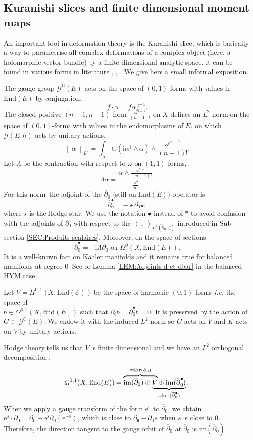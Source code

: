 \documentclass{article}
\theoremstyle{remark}
\theoremstyle{definition}
\newcommand{\C}{\mathbb{C}}
\newcommand{\im}{\mathrm{im}}
\newcommand{\End}{\mathrm{End}}
\newcommand{\tr}{\mathrm{tr}}
\renewcommand{\i}{\boldsymbol{\mathrm{i}}}
\newcommand{\e}{\boldsymbol{\mathrm{e}}}
\newcommand{\scal}[2]{\left< #1,#2 \right>}
\newcommand{\norme}[1]{\left\| #1 \right\|}
\newcommand{\E}{\mathcal{E}}
\newcommand{\G}{\mathcal{G}}
\newcommand{\dbar}{\overline{\partial}}
\begin{document}
\subsection{Kuranishi slices and finite dimensional moment maps}

An important tool in deformation theory is the Kuranishi slice, which is basically a way to parametrise all complex deformations of a complex object (here, a holomorphic vector bundle) by a finite dimensional analytic space. It can be found in various forms in literature \cite{Kuranishi}, \cite[Section 7.3]{Kobayashi}, \cite[Theorem 1]{Buchdahl_Schumacher}. We give here a small informal exposition.

The gauge group $\G^\C(E)$ acts on the space of $(0,1)$-forms with values in $\End(E)$ by conjugation,
$$
f \cdot \alpha = f\alpha f^{-1}.
$$
The closed positive $(n - 1,n - 1)$-form $\frac{\omega^{n - 1}}{(n - 1)!}$ on $X$ defines an $L^2$ norm on the space of $(0,1)$-forms with values in the endomorphisms of $E$, on which $\G(E,h)$ acts by unitary actions,
$$
\norme{\alpha}_{L^2} = \int_X \tr(\i\alpha^\dagger \wedge \alpha) \wedge \frac{\omega^{n - 1}}{(n - 1)!}.
$$
Let $\Lambda$ be the contraction with respect to $\omega$ on $(1,1)$-forms,
$$
\Lambda\alpha = \frac{\alpha \wedge \frac{\omega^{n - 1}}{(n - 1)!}}{\frac{\omega^n}{n!}}.
$$
For this norm, the adjoint of the $\dbar_0$ (still on $\End(E)$) operator is
$$
\dbar_0^\bullet = -\star\partial_0\star,
$$
where $\star$ is the Hodge star. We use the notation $\bullet$ instead of $*$ to avoid confusion with the adjoints of $\dbar_0$ with respect to the $\scal{\cdot}{\cdot}_{L^2(\dbar_0,\zeta)}$ introduced in Sub-section \ref{SEC:Produits scalaires}. Moreover, on the space of sections,
$$
\dbar_0^\bullet = -\i\Lambda\partial_0 \textrm{ on } \Omega^0(X,\End(E)).
$$
It is a well-known fact on Kähler manifolds and it remains true for balanced manifolds at degree $0$. See \cite[Lemma 2.1]{Delloque_2024} or Lemma \ref{LEM:Adjoints d et dbar} in the balanced HYM case.

Let $V = H^{0,1}(X,\End(\E))$ be the space of harmonic $(0,1)$-forms \textit{i.e.} the space of\\
$b \in \Omega^{0,1}(X,\End(E))$ such that $\dbar_0b = \dbar_0^\bullet b = 0$. It is preserved by the action of $G \subset \G^\C(E)$. We endow it with the induced $L^2$ norm so $G$ acts on $V$ and $K$ acts on $V$ by unitary actions.

Hodge theory tells us that $V$ is finite dimensional and we have an $L^2$ orthogonal decomposition \cite[Theorem 7.1]{Demailly},
\begin{equation}\label{EQ:Hodge}
    \Omega^{0,1}(X,\End(E)) = \lefteqn{\overbrace{\phantom{\im(\dbar_0) \oplus V}}^{= \ker(\dbar_0)}} \im(\dbar_0) \oplus \underbrace{V \oplus \im(\dbar_0^\bullet)}_{= \ker(\dbar_0^\bullet)}.
\end{equation}
When we apply a gauge transform of the form $\e^s$ to $\dbar_0$, we obtain $\e^s \cdot \dbar_0 = \dbar_0 + \e^s\dbar_0(\e^{-s})$, which is close to $\dbar_0 - \dbar_0s$ when $s$ is close to $0$. Therefore, the direction tangent to the gauge orbit of $\dbar_0$ at $\dbar_0$ is $\im(\dbar_0)$.
\end{document}
